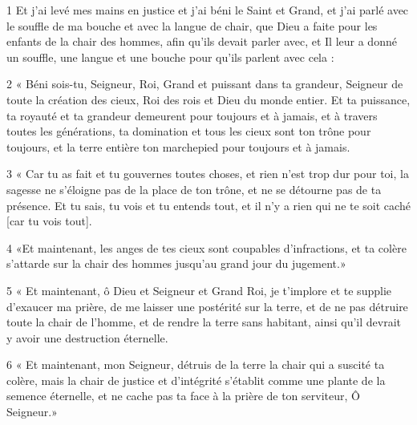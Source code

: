 
\par 1 Et j'ai levé mes mains en justice et j'ai béni le Saint et Grand, et j'ai parlé avec le souffle de ma bouche et avec la langue de chair, que Dieu a faite pour les enfants de la chair des hommes, afin qu'ils devait parler avec, et Il leur a donné un souffle, une langue et une bouche pour qu'ils parlent avec cela :
\par 2 « Béni sois-tu, Seigneur, Roi, Grand et puissant dans ta grandeur, Seigneur de toute la création des cieux, Roi des rois et Dieu du monde entier. Et ta puissance, ta royauté et ta grandeur demeurent pour toujours et à jamais, et à travers toutes les générations, ta domination et tous les cieux sont ton trône pour toujours, et la terre entière ton marchepied pour toujours et à jamais.
\par 3 « Car tu as fait et tu gouvernes toutes choses, et rien n'est trop dur pour toi, la sagesse ne s'éloigne pas de la place de ton trône, et ne se détourne pas de ta présence. Et tu sais, tu vois et tu entends tout, et il n’y a rien qui ne te soit caché [car tu vois tout].
\par 4 «Et maintenant, les anges de tes cieux sont coupables d'infractions, et ta colère s'attarde sur la chair des hommes jusqu'au grand jour du jugement.»
\par 5 « Et maintenant, ô Dieu et Seigneur et Grand Roi, je t'implore et te supplie d'exaucer ma prière, de me laisser une postérité sur la terre, et de ne pas détruire toute la chair de l'homme, et de rendre la terre sans habitant, ainsi qu'il devrait y avoir une destruction éternelle.
\par 6 « Et maintenant, mon Seigneur, détruis de la terre la chair qui a suscité ta colère, mais la chair de justice et d'intégrité s'établit comme une plante de la semence éternelle, et ne cache pas ta face à la prière de ton serviteur, Ô Seigneur.»


